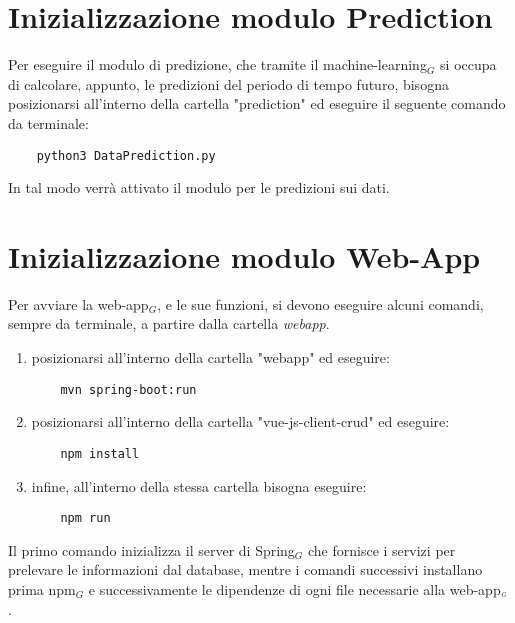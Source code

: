 \section{Inizializzazione modulo Prediction}\label{ProceduraDiInstallazioneInizializzazioneModuloPrediction}
Per eseguire il modulo di predizione, che tramite il machine-learning$_G$ si occupa di calcolare, appunto, le predizioni del periodo di tempo futuro, bisogna posizionarsi all'interno della cartella "prediction" ed eseguire il seguente comando da terminale:

\begin{lstlisting}
    python3 DataPrediction.py
\end{lstlisting}
In tal modo verrà attivato il modulo per le predizioni sui dati.


\section{Inizializzazione modulo Web-App}\label{ProceduraDiInstallazioneInizializzazioneModuloWebApp}
Per avviare la web-app$_G$, e le sue funzioni, si devono eseguire alcuni comandi, sempre da terminale, a partire dalla cartella \textit{webapp}.
\begin{enumerate}
  \item posizionarsi all'interno della cartella "webapp" ed eseguire:
  \begin{lstlisting}
    mvn spring-boot:run
  \end{lstlisting}
  \item posizionarsi all'interno della cartella "vue-js-client-crud" ed eseguire:
  \begin{lstlisting}
    npm install
  \end{lstlisting}
  \item infine, all'interno della stessa cartella bisogna eseguire:
  \begin{lstlisting}
    npm run
  \end{lstlisting}
\end{enumerate}
Il primo comando inizializza il server di Spring$_G$ che fornisce i servizi per prelevare le informazioni dal database, mentre i comandi successivi installano prima npm$_G$ e successivamente le dipendenze di ogni file necessarie alla web-app$_{\scaleto{G}{3pt}}$.
